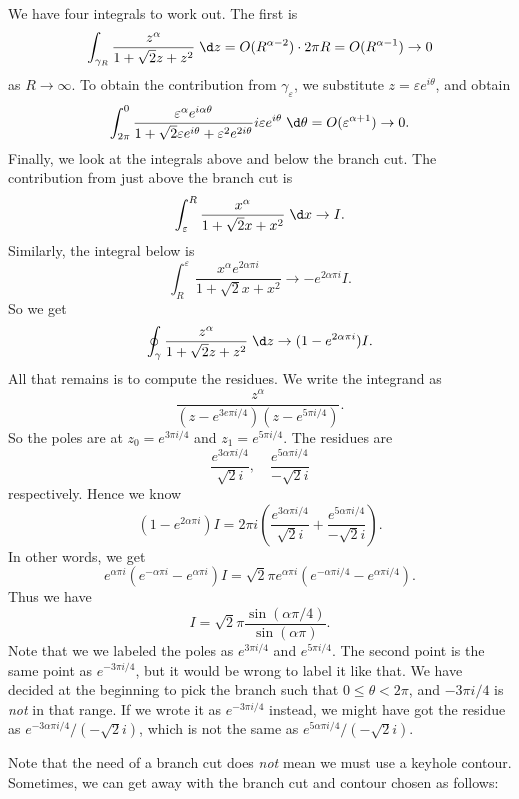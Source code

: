 \documentclass[a4paper]{article}
\begin{document}
\begin{eg}
  We have four integrals to work out. The first is
  \[
    \int_{\gamma_R} \frac{z^\alpha}{1 + \sqrt{2}z + z^2} \;\d z= O(R^{\alpha - 2}) \cdot 2\pi R = O(R^{\alpha - 1}) \to 0
  \]
  as $R \to \infty$. To obtain the contribution from $\gamma_\varepsilon$, we substitute $z = \varepsilon e^{i\theta}$, and obtain
  \[
    \int_{2\pi}^0 \frac{\varepsilon^\alpha e^{i\alpha\theta}}{1 + \sqrt{2} \varepsilon e^{i\theta} + \varepsilon^2 e^{2i \theta}} i \varepsilon e^{i\theta}\;\d \theta = O(\varepsilon^{\alpha + 1}) \to 0.
  \]
  Finally, we look at the integrals above and below the branch cut. The contribution from just above the branch cut is
  \[
    \int_\varepsilon^R \frac{x^{\alpha}}{1 + \sqrt{2}x + x^2}\;\d x \to I.
  \]
  Similarly, the integral below is
  \[
    \int_R^\varepsilon \frac{x^\alpha e^{2\alpha \pi i}}{1 + \sqrt{2}x + x^2} \to -e^{2\alpha \pi i}I.
  \]
  So we get
  \[
    \oint_\gamma \frac{z^\alpha}{1 + \sqrt{2} z + z^2}\;\d z \to (1 - e^{2\alpha \pi i})I.
  \]
  All that remains is to compute the residues. We write the integrand as
  \[
    \frac{z^\alpha}{(z - e^{3e\pi i/4})(z - e^{5\pi i/4})}.
  \]
  So the poles are at $z_0 = e^{3\pi i/4}$ and $z_1 = e^{5\pi i/4}$. The residues are
  \[
    \frac{e^{3\alpha \pi i/4}}{\sqrt{2} i},\quad \frac{e^{5\alpha\pi i/4}}{-\sqrt{2}i}
  \]
  respectively. Hence we know
  \[
    (1 - e^{2\alpha \pi i})I = 2\pi i\left(\frac{e^{3\alpha \pi i/4}}{\sqrt{2} i} + \frac{e^{5\alpha \pi i/4}}{-\sqrt{2} i}\right).
  \]
  In other words, we get
  \[
    e^{\alpha \pi i}(e^{-\alpha \pi i} - e^{\alpha \pi i})I = \sqrt{2} \pi e^{\alpha \pi i} (e^{-\alpha \pi i/4} - e^{\alpha \pi i/4}).
  \]
  Thus we have
  \[
    I = \sqrt{2} \pi \frac{\sin(\alpha \pi/4)}{\sin (\alpha\pi)}.
  \]
  Note that we we labeled the poles as $e^{3\pi i/4}$ and $e^{5 \pi i/4}$. The second point is the same point as $e^{-3\pi i/4}$, but it would be wrong to label it like that. We have decided at the beginning to pick the branch such that $0 \leq \theta < 2\pi$, and $-3\pi i/4$ is \emph{not} in that range. If we wrote it as $e^{-3\pi i/4}$ instead, we might have got the residue as $e^{-3 \alpha \pi i/4}/(-\sqrt{2}i)$, which is not the same as $e^{5 \alpha \pi i/4}/(-\sqrt{2}i)$.
\end{eg}
Note that the need of a branch cut does \emph{not} mean we must use a keyhole contour. Sometimes, we can get away with the branch cut and contour chosen as follows:
\begin{center}
\end{center}
\end{document}
